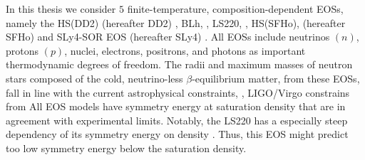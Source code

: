 In this thesis we consider $5$ finite-temperature, composition-dependent \acp{EOS}, namely the 
HS(DD2) (hereafter DD2) \citep{Typel:2009sy,Hempel:2009mc}, 
BLh, \citep{Bombaci:2018ksa}, 
LS220, \citep{Lattimer:1991nc}, 
HS(SFHo), (hereafter SFHo) \citep{Steiner:2012rk} and 
SLy4-SOR EOS (hereafter SLy4) \citep{daSilvaSchneider:2017jpg}.
%
All \acp{EOS} include neutrinos $(n)$, protons $(p)$, nuclei, electrons, positrons, and photons
as important thermodynamic degrees of freedom.
%
The radii and maximum masses of neutron stars composed of the cold, neutrino-less $\beta$-equilibrium matter,
from these \acp{EOS}, fall in line with the current astrophysical constraints, 
\eg, LIGO/Virgo constrains from \GW{} 
\citep{TheLIGOScientific:2017qsa,Abbott:2018wiz,De:2018uhw,Abbott:2018exr}
%
All EOS models have symmetry energy at saturation density that are in agreement with experimental limits.
Notably, the LS220 has a especially steep dependency of its symmetry energy on density \citep[\eg][]{Lattimer:2012xj,Danielewicz:2013upa}. 
Thus, this \ac{EOS} might predict too low symmetry energy below the saturation density. 

